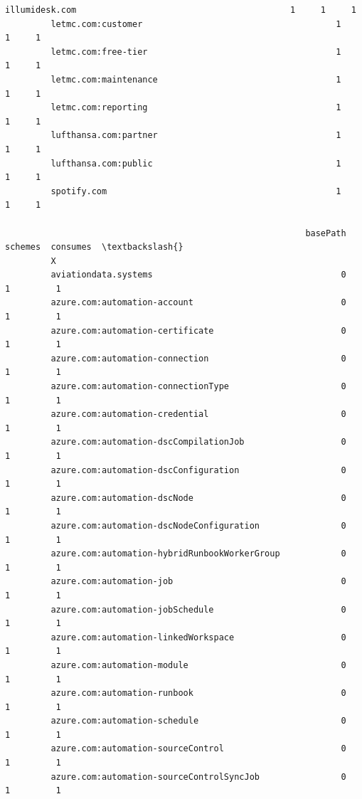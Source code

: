 \documentclass[11pt]{article}
\begin{document}
\begin{Verbatim}[commandchars=\\\{\}]
         illumidesk.com                                          1     1     1   
         letmc.com:customer                                      1     1     1   
         letmc.com:free-tier                                     1     1     1   
         letmc.com:maintenance                                   1     1     1   
         letmc.com:reporting                                     1     1     1   
         lufthansa.com:partner                                   1     1     1   
         lufthansa.com:public                                    1     1     1   
         spotify.com                                             1     1     1   
         
                                                           basePath  schemes  consumes  \textbackslash{}
         X                                                                               
         aviationdata.systems                                     0        1         1   
         azure.com:automation-account                             0        1         1   
         azure.com:automation-certificate                         0        1         1   
         azure.com:automation-connection                          0        1         1   
         azure.com:automation-connectionType                      0        1         1   
         azure.com:automation-credential                          0        1         1   
         azure.com:automation-dscCompilationJob                   0        1         1   
         azure.com:automation-dscConfiguration                    0        1         1   
         azure.com:automation-dscNode                             0        1         1   
         azure.com:automation-dscNodeConfiguration                0        1         1   
         azure.com:automation-hybridRunbookWorkerGroup            0        1         1   
         azure.com:automation-job                                 0        1         1   
         azure.com:automation-jobSchedule                         0        1         1   
         azure.com:automation-linkedWorkspace                     0        1         1   
         azure.com:automation-module                              0        1         1   
         azure.com:automation-runbook                             0        1         1   
         azure.com:automation-schedule                            0        1         1   
         azure.com:automation-sourceControl                       0        1         1   
         azure.com:automation-sourceControlSyncJob                0        1         1   

\end{Verbatim}
\end{document}

